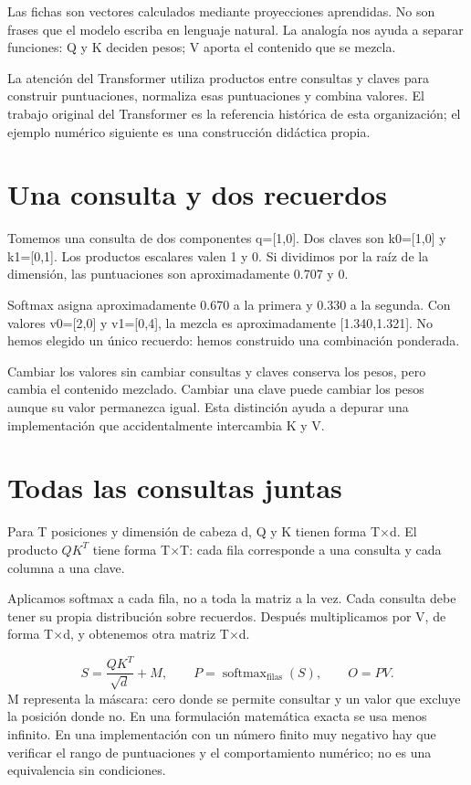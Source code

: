 \documentclass[12pt,a4paper,oneside]{report}
\begin{document}
Las fichas son vectores calculados mediante proyecciones aprendidas. No son frases que el modelo escriba en lenguaje natural. La analogía nos ayuda a separar funciones: Q y K deciden pesos; V aporta el contenido que se mezcla.

La atención del Transformer utiliza productos entre consultas y claves para construir puntuaciones, normaliza esas puntuaciones y combina valores. El trabajo original del Transformer es la referencia histórica de esta organización; el ejemplo numérico siguiente es una construcción didáctica propia. \cite{attention}

\section{Una consulta y dos recuerdos}
Tomemos una consulta de dos componentes q=[1,0]. Dos claves son k0=[1,0] y k1=[0,1]. Los productos escalares valen 1 y 0. Si dividimos por la raíz de la dimensión, las puntuaciones son aproximadamente 0.707 y 0.

Softmax asigna aproximadamente 0.670 a la primera y 0.330 a la segunda. Con valores v0=[2,0] y v1=[0,4], la mezcla es aproximadamente [1.340,1.321]. No hemos elegido un único recuerdo: hemos construido una combinación ponderada.

Cambiar los valores sin cambiar consultas y claves conserva los pesos, pero cambia el contenido mezclado. Cambiar una clave puede cambiar los pesos aunque su valor permanezca igual. Esta distinción ayuda a depurar una implementación que accidentalmente intercambia K y V.

\section{Todas las consultas juntas}
Para T posiciones y dimensión de cabeza d, Q y K tienen forma T\ensuremath{\times}d. El producto $QK^T$ tiene forma T\ensuremath{\times}T: cada fila corresponde a una consulta y cada columna a una clave.

Aplicamos softmax a cada fila, no a toda la matriz a la vez. Cada consulta debe tener su propia distribución sobre recuerdos. Después multiplicamos por V, de forma T\ensuremath{\times}d, y obtenemos otra matriz T\ensuremath{\times}d.

\[
S=\frac{QK^T}{\sqrt d}+M,\qquad
P=\operatorname{softmax}_{\text{filas}}(S),\qquad
O=PV.
\]
M representa la máscara: cero donde se permite consultar y un valor que excluye la posición donde no. En una formulación matemática exacta se usa menos infinito. En una implementación con un número finito muy negativo hay que verificar el rango de puntuaciones y el comportamiento numérico; no es una equivalencia sin condiciones.
\end{document}
